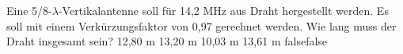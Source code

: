     {Eine 5/8-$\lambda$-Vertikalantenne soll für 14,2 MHz aus Draht hergestellt werden. Es soll mit einem Verkürzungsfaktor von 0,97 gerechnet werden. Wie lang muss der Draht insgesamt sein?}
    {12,80 m}
    {13,20 m}
    {10,03 m}
    {13,61 m}
    {false}{false}